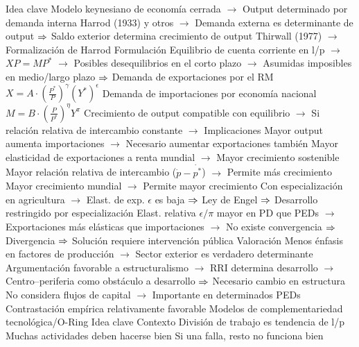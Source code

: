 \documentclass{nuevotema}
\begin{document}
\begin{esquemal}
				\4 Idea clave
				\4[] Modelo keynesiano de economía cerrada
				\4[] $\to$ Output determinado por demanda interna
				\4[] Harrod (1933) y otros
				\4[] $\to$ Demanda externa es determinante de output
				\4[] $\Rightarrow$ Saldo exterior determina crecimiento de output
				\4[] Thirwall (1977)
				\4[] $\to$ Formalización de Harrod
				\4 Formulación
				\4[] Equilibrio de cuenta corriente en l/p
				\4[] $\to$ $XP = MP^*$
				\4[] $\to$ Posibles desequilibrios en el corto plazo
				\4[] $\to$ Asumidas imposibles en medio/largo plazo
				\4[] $\Rightarrow$
				\4[] Demanda de exportaciones por el RM
				\4[] $X=A \cdot \left( \frac{P^*}{P} \right)^\gamma (Y^*)^\epsilon$
				\4[] Demanda de importaciones por economía nacional
				\4[] $M=B \cdot \left( \frac{P}{P^*} \right)^\eta Y^\pi$
				\4[] Crecimiento de output compatible con equilibrio
				\4[] $\to$ 
				\4[] Si relación relativa de intercambio constante
				\4[] $\to$ 
				\4 Implicaciones
				\4[] Mayor output aumenta importaciones
				\4[] $\to$ Necesario aumentar exportaciones también
				\4[] Mayor elasticidad de exportaciones a renta mundial
				\4[] $\to$ Mayor crecimiento sostenible
				\4[] Mayor relación relativa de intercambio ($\dot{p} - \dot{p^*}$)
				\4[] $\to$ Permite más crecimiento
				\4[] Mayor crecimiento mundial
				\4[] $\to$ Permite mayor crecimiento
				\4[] Con especialización en agricultura
				\4[] $\to$ Elast. de exp. $\epsilon$ es baja
				\4[] $\Rightarrow$ Ley de Engel
				\4[] $\Rightarrow$ Desarrollo restringido por especialización
				\4[] Elast. relativa $\epsilon/\pi$ mayor en PD que PEDs
				\4[] $\to$ Exportaciones más elásticas que importaciones
				\4[] $\to$ No existe convergencia
				\4[] $\Rightarrow$ Divergencia
				\4[] $\Rightarrow$ Solución requiere intervención pública
				\4 Valoración
				\4[] Menos énfasis en factores de producción
				\4[] $\to$ Sector exterior es verdadero determinante
				\4[] Argumentación favorable a estructuralismo
				\4[] $\to$ RRI determina desarrollo
				\4[] $\to$ Centro--periferia como obstáculo a desarrollo
				\4[] $\Rightarrow$ Necesario cambio en estructura
				\4[] No considera flujos de capital
				\4[] $\to$ Importante en determinados PEDs
				\4[] Contrastación empírica relativamente favorable
		\2 Modelos de complementariedad tecnológica/O-Ring
			\3 Idea clave
				\4 Contexto
				\4[] División de trabajo es tendencia de l/p
				\4[] Muchas actividades deben hacerse bien
				\4[] Si una falla, resto no funciona bien

\end{esquemal}
\end{document}
